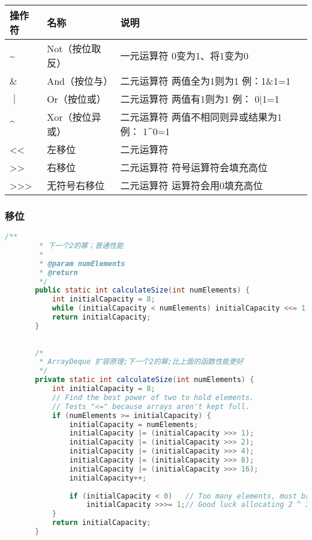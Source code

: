 \renewcommand\arraystretch{2}
\begin{tabular}{l|l|l}
    操作符    &     名称          &     说明                                                       \\   \hline
    \~{}     &  Not（按位取反）   & 一元运算符   \quad 0变为1、将1变为0                                \\
    \&       &   And（按位与）    & 二元运算符   \quad 两值全为1则为1 \quad 例：1\&1=1                 \\
    ｜       &   Or（按位或）     & 二元运算符    \quad 两值有1则为1 \quad 例： 0|1=1                   \\
    \^{}     &   Xor（按位异或）  & 二元运算符    \quad 两值不相同则异或结果为1 \quad 例： 1\^{}0=1       \\
    <<       &  左移位           & 二元运算符    \quad                                               \\
    >>       &  右移位           & 二元运算符    \quad 符号运算符会填充高位                             \\ 
    >>>      & 无符号右移位       & 二元运算符    \quad 运算符会用0填充高位                              \\
\end{tabular}\newline


\subsubsection{移位}

\begin{lstlisting}[language=java]
        /**
        * 下一个2的幂；普通性能
        *
        * @param numElements
        * @return
        */
       public static int calculateSize(int numElements) {
           int initialCapacity = 8;
           while (initialCapacity < numElements) initialCapacity <<= 1;
           return initialCapacity;
       }
   
   
       /*
        * ArrayDeque 扩容原理;下一个2的幂;比上面的函数性能更好
        */
       private static int calculateSize(int numElements) {
           int initialCapacity = 8;
           // Find the best power of two to hold elements.
           // Tests "<=" because arrays aren't kept full.
           if (numElements >= initialCapacity) {
               initialCapacity = numElements;
               initialCapacity |= (initialCapacity >>> 1);
               initialCapacity |= (initialCapacity >>> 2);
               initialCapacity |= (initialCapacity >>> 4);
               initialCapacity |= (initialCapacity >>> 8);
               initialCapacity |= (initialCapacity >>> 16);
               initialCapacity++;
   
               if (initialCapacity < 0)   // Too many elements, must back off
                   initialCapacity >>>= 1;// Good luck allocating 2 ^ 30 elements
           }
           return initialCapacity;
       }
   
\end{lstlisting}


